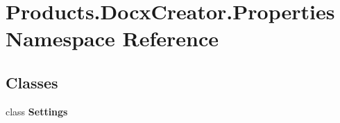 \hypertarget{namespace_products_1_1_docx_creator_1_1_properties}{}\section{Products.\+Docx\+Creator.\+Properties Namespace Reference}
\label{namespace_products_1_1_docx_creator_1_1_properties}
\subsection*{Classes}
\begin{DoxyCompactItemize}
\item 
class {\bfseries Settings}
\end{DoxyCompactItemize}
